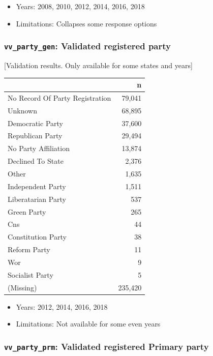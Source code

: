 \documentclass[10pt,article,oneside]{memoir}
\theoremstyle{definition}
\begin{document}
\begin{itemize}
\tightlist
\item
  Years: 2008, 2010, 2012, 2014, 2016, 2018
\item
  Limitations: Collapses some response options
\end{itemize}

\hypertarget{vv_party_gen-validated-registered-party}{%
\subsubsection{\texorpdfstring{\texttt{vv\_party\_gen}: Validated
registered
party}{vv\_party\_gen: Validated registered party}}\label{vv_party_gen-validated-registered-party}}

{[}Validation results. Only available for some states and years{]}

\begin{table}[H]
\centering
\begin{tabular}{lr}
\toprule
 & n\\
\midrule
No Record Of Party Registration & 79,041\\
Unknown & 68,895\\
Democratic Party & 37,600\\
Republican Party & 29,494\\
No Party Affiliation & 13,874\\
Declined To State & 2,376\\
Other & 1,635\\
Independent Party & 1,511\\
Liberatarian Party & 537\\
Green Party & 265\\
Cns & 44\\
Constitution Party & 38\\
Reform Party & 11\\
Wor & 9\\
Socialist Party & 5\\
(Missing) & 235,420\\
\bottomrule
\end{tabular}
\end{table}

\begin{itemize}
\tightlist
\item
  Years: 2012, 2014, 2016, 2018
\item
  Limitations: Not available for some even years
\end{itemize}

\hypertarget{vv_party_prm-validated-registered-primary-party}{%
\subsubsection{\texorpdfstring{\texttt{vv\_party\_prm}: Validated
registered Primary
party}{vv\_party\_prm: Validated registered Primary party}}\label{vv_party_prm-validated-registered-primary-party}}
\end{document}
